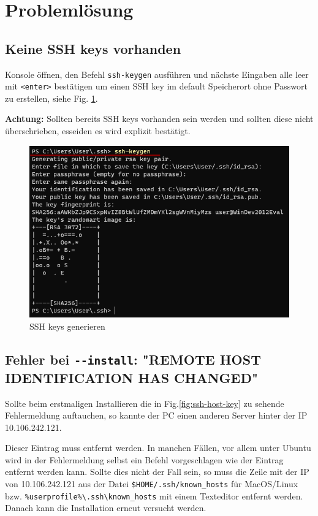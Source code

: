 \documentclass[11pt, a4paper]{article}
\begin{document}
\clearpage
\section{Problemlösung}

\subsection{Keine SSH keys vorhanden}\label{sec:ssh}
Konsole öffnen, den Befehl \texttt{ssh-keygen} ausführen und nächste Eingaben alle leer mit \texttt{<enter>} bestätigen um einen SSH key im default Speicherort ohne Passwort zu erstellen, siehe Fig. \ref{fig:ssh}.

\textbf{Achtung:} Sollten bereits SSH keys vorhanden sein werden und sollten diese nicht überschrieben, esseiden es wird explizit bestätigt.

\begin{figure}[h]
    \centering
    \includegraphics[width=0.7\linewidth]{./pics/2022-03-09_00-17.png}
    \caption{SSH keys generieren}
    \label{fig:ssh}
\end{figure}


\subsection{Fehler bei \texttt{-{}-install}: "REMOTE HOST IDENTIFICATION HAS CHANGED"}\label{sec:ssh}
Sollte beim erstmaligen Installieren die in Fig.\ref{fig:ssh-host-key} zu sehende Fehlermeldung auftauchen, so kannte der PC einen anderen Server hinter der IP 10.106.242.121.

Dieser Eintrag muss entfernt werden. In manchen Fällen, vor allem unter Ubuntu wird in der Fehlermeldung selbst ein Befehl vorgeschlagen wie der Eintrag entfernt werden kann.
Sollte dies nicht der Fall sein, so muss die Zeile mit der IP von 10.106.242.121 aus der Datei \texttt{\$HOME/.ssh/known\_hosts} für MacOS/Linux bzw. \texttt{\%userprofile\%\textbackslash.ssh\textbackslash{}known\_hosts} mit einem Texteditor entfernt werden.
Danach kann die Installation erneut versucht werden.
\end{document}

